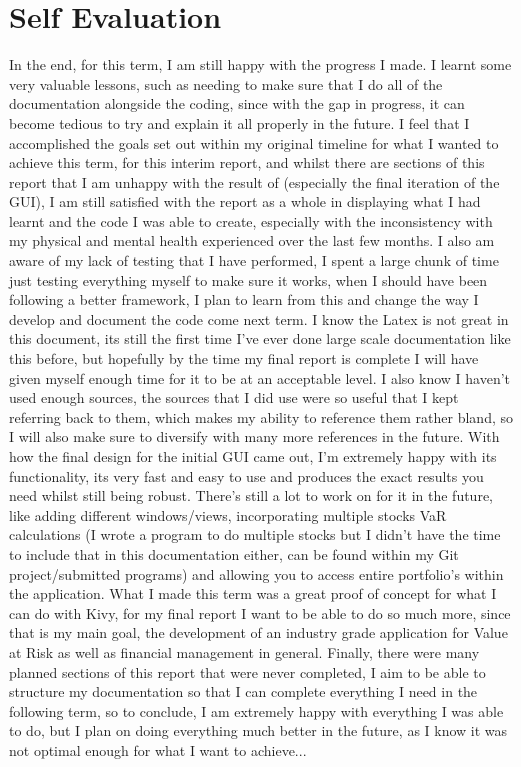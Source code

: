 \documentclass{article}
\begin{document}
\section{Self Evaluation}
In the end, for this term, I am still happy with the progress I made. I learnt some very valuable lessons, such as needing to make sure that I do all of the documentation alongside the coding, since with the gap in progress, it can become tedious to try and explain it all properly in the future. I feel that I accomplished the goals set out within my original timeline for what I wanted to achieve this term, for this interim report, and whilst there are sections of this report that I am unhappy with the result of (especially the final iteration of the GUI), I am still satisfied with the report as a whole in displaying what I had learnt and the code I was able to create, especially with the inconsistency with my physical and mental health experienced over the last few months. I also am aware of my lack of testing that I have performed, I spent a large chunk of time just testing everything myself to make sure it works, when I should have been following a better framework, I plan to learn from this and change the way I develop and document the code come next term. I know the Latex is not great in this document, its still the first time I've ever done large scale documentation like this before, but hopefully by the time my final report is complete I will have given myself enough time for it to be at an acceptable level. I also know I haven't used enough sources, the sources that I did use were so useful that I kept referring back to them, which makes my ability to reference them rather bland, so I will also make sure to diversify with many more references in the future. With how the final design for the initial GUI came out, I'm extremely happy with its functionality, its very fast and easy to use and produces the exact results you need whilst still being robust. There's still a lot to work on for it in the future, like adding different windows/views, incorporating multiple stocks VaR calculations (I wrote a program to do multiple stocks but I didn't have the time to include that in this documentation either, can be found within my Git project/submitted programs) and allowing you to access entire portfolio's within the application. What I made this term was a great proof of concept for what I can do with Kivy, for my final report I want to be able to do so much more, since that is my main goal, the development of an industry grade application for Value at Risk as well as financial management in general. Finally, there were many planned sections of this report that were never completed, I aim to be able to structure my documentation so that I can complete everything I need in the following term, so to conclude, I am extremely happy with everything I was able to do, but I plan on doing everything much better in the future, as I know it was not optimal enough for what I want to achieve...
\end{document}
